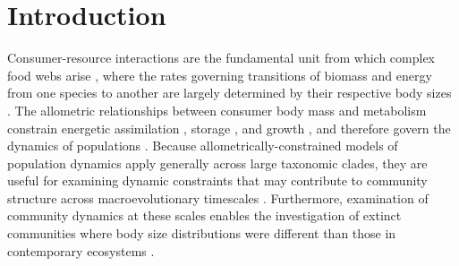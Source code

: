 \documentclass[]{rsos}%
\begin{document}
\maketitle

\section{Introduction}

Consumer-resource interactions are the fundamental unit from which complex food webs arise \cite{deangelis1980energy}, where the rates governing transitions of biomass and energy from one species to another are largely determined by their respective body sizes \cite{Yodzis:1992hg}. 
The allometric relationships between consumer body mass and metabolism constrain energetic assimilation \cite{hou2008}, storage \cite{Lindstedt:2002td}, and growth \cite{West:2001bv}, and therefore govern the dynamics of populations \cite{hennemann1983relationship,West:2002it,Kempes:2012hy,yeakel2018dynamics}. 
Because allometrically-constrained models of population dynamics apply generally across large taxonomic clades, they are useful for examining dynamic constraints that may contribute to community structure across macroevolutionary timescales \cite{yeakel2018dynamics,bhat2020scaling}.
Furthermore, examination of community dynamics at these scales enables the investigation of extinct communities where body size distributions were different than those in contemporary ecosystems \cite{alroy2001multispecies,brook2008synergies,bradshaw2021relative}.
\end{document}
